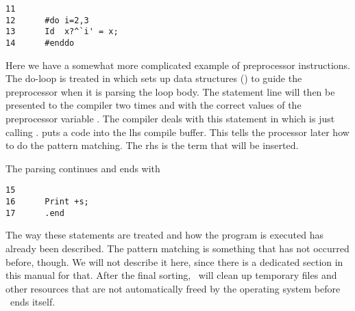 \begin{verbatim}
11      
12      #do i=2,3
13      Id	x?^`i' = x;
14      #enddo
\end{verbatim}

Here we have a somewhat more complicated example of preprocessor instructions.
The do-loop is treated in  which sets up data structures ()
to guide the preprocessor when it is parsing the loop body. The statement line
will then be presented to the compiler two times and with the correct values of
the preprocessor variable . The compiler deals with this statement in
 which is just calling .  
puts a  code into the lhs compile buffer. This tells the processor
later how to do the pattern matching. The rhs is the term  that will be
inserted.

The parsing continues and ends with

\begin{verbatim}
15      
16      Print +s;
17      .end
\end{verbatim}

The way these statements are treated and how the program is executed has already
been described. The pattern matching is something that has not occurred before,
though. We will not describe it here, since there is a dedicated section in this
manual for that. After the final sorting, \FORM\ will clean up temporary files and
other resources that are not automatically freed by the operating system before
\FORM\ ends itself.
